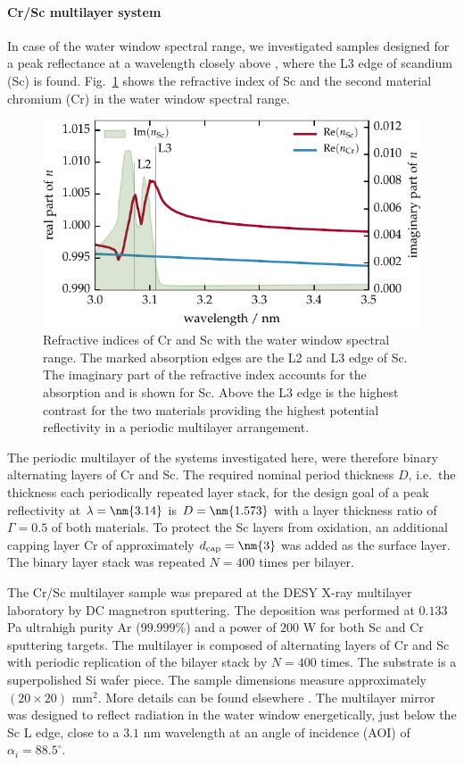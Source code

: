 \paragraph{Cr/Sc multilayer system}
In case of the water window spectral range, we investigated samples designed for a peak reflectance at a wavelength closely above , where the L3 edge of scandium (Sc) is found. Fig.~\ref{ch_exp:fig_crsc_contrast} shows the refractive index of Sc and the second material chromium (Cr) in the water window spectral range. 
\begin{figure}[htb]
        \includegraphics{img/Cr_Sc_contrast}
        \caption[Refractive indices of Cr and Sc in the water window.]{%
            Refractive indices of Cr and Sc with the water window spectral range. The marked absorption edges are the L2 and L3 edge of Sc. The imaginary part of the refractive index accounts for the absorption and is shown for Sc. Above the L3 edge is the highest contrast for the two materials providing the highest potential reflectivity in a periodic multilayer arrangement.}
        \label{ch_exp:fig_crsc_contrast}
\end{figure}
The periodic multilayer of the systems investigated here, were therefore binary alternating layers of Cr and Sc. The required nominal period thickness $D$, i.e.~the thickness each periodically repeated layer stack, for the design goal of a peak reflectivity at $\lambda=\nm{3.14}$ is $D=\nm{1.573}$ with a layer thickness ratio of $\Gamma=0.5$ of both materials. To protect the Sc layers from oxidation, an additional capping layer Cr of approximately $d_\text{cap} = \nm{3}$ was added as the surface layer. The binary layer stack was repeated $N=400$ times per bilayer.

The Cr/Sc multilayer sample was prepared at the DESY X-ray multilayer 
laboratory by DC magnetron sputtering. The deposition was performed at $0.133$ 
Pa ultrahigh purity Ar ($99.999\%$) and a power of $200$ W for both Sc and Cr 
sputtering targets. The multilayer is composed of alternating layers of Cr and 
Sc with periodic replication of the bilayer stack by $N=400$ times. The 
substrate is a superpolished Si wafer piece. The sample dimensions measure 
approximately $(20 \times 20)$ mm$^2$. More details can be found elsewhere 
\cite{prasciolu_thermal_2014}. The multilayer mirror was designed to reflect 
radiation in the water window energetically, just below the Sc L edge, close to 
a $3.1$ nm wavelength at an angle of incidence (AOI) of $\alpha_i = 
88.5^\circ$.


